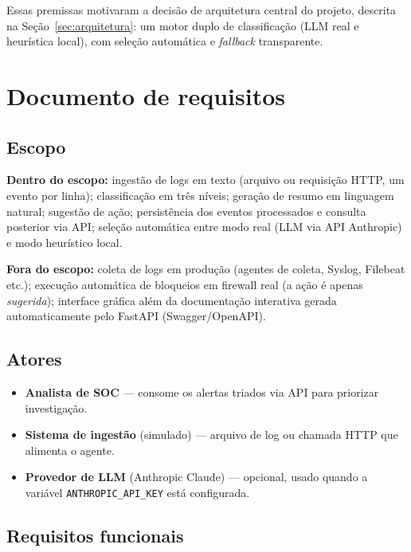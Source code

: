 \documentclass[11pt,a4paper]{article}
\begin{document}
Essas premissas motivaram a decisão de arquitetura central do projeto, descrita na
Seção~\ref{sec:arquitetura}: um motor duplo de classificação (LLM real e heurística
local), com seleção automática e \emph{fallback} transparente.

\section{Documento de requisitos}

\subsection{Escopo}

\textbf{Dentro do escopo:} ingestão de logs em texto (arquivo ou requisição HTTP, um
evento por linha); classificação em três níveis; geração de resumo em linguagem
natural; sugestão de ação; persistência dos eventos processados e consulta posterior
via API; seleção automática entre modo real (LLM via API Anthropic) e modo heurístico
local.

\textbf{Fora do escopo:} coleta de logs em produção (agentes de coleta, Syslog,
Filebeat etc.); execução automática de bloqueios em firewall real (a ação é apenas
\emph{sugerida}); interface gráfica além da documentação interativa gerada
automaticamente pelo FastAPI (Swagger/OpenAPI).

\subsection{Atores}

\begin{itemize}[nosep]
  \item \textbf{Analista de SOC} --- consome os alertas triados via API para
  priorizar investigação.
  \item \textbf{Sistema de ingestão} (simulado) --- arquivo de log ou chamada HTTP
  que alimenta o agente.
  \item \textbf{Provedor de LLM} (Anthropic Claude) --- opcional, usado quando a
  variável \verb|ANTHROPIC_API_KEY| está configurada.
\end{itemize}

\subsection{Requisitos funcionais}
\end{document}
